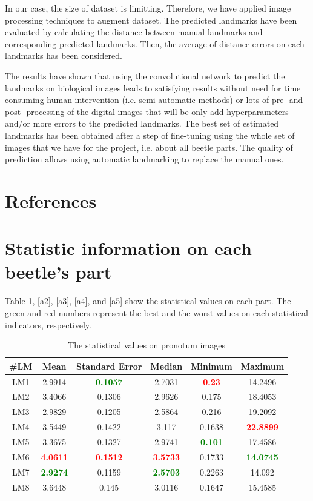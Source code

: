 \documentclass[review]{elsarticle}
\begin{document}
In our case, the size of dataset is limitting. Therefore, we have applied image processing techniques to augment dataset. The predicted landmarks have been evaluated by calculating the distance between manual landmarks and corresponding predicted landmarks. Then, the average of distance errors on each landmarks has been considered.

The results have shown that using the convolutional network to predict the landmarks on biological images leads to satisfying results without need for time consuming human intervention (i.e. semi-automatic methods) or lots of pre- and post- processing of the digital images that will be only add hyperparameters and/or more errors to the predicted landmarks. The
best set of estimated landmarks has been obtained after a step
of fine-tuning using the whole set of images that we have for the
project, i.e. about all beetle parts. The quality of prediction allows using automatic landmarking to replace the manual ones.
\section*{References}



\pagebreak
\appendix
\section{Statistic information on each beetle's part}
\label{appdixA}
Table \ref{a1}, \ref{a2}, \ref{a3}, \ref{a4}, and \ref{a5} show the statistical values on each part. The green and red numbers represent the best and the worst values on each statistical indicators, respectively.  
\begin{table}[htbp]
\begin{tabular}{ | c | c | c | c | c | c | }
\hline
	\textbf{\#LM} & \textbf{Mean} & \textbf{Standard Error} & \textbf{Median} & \textbf{Minimum} & \textbf{Maximum} \\ \hline
	LM1 & 2.9914 & \textcolor{green}{\textbf{0.1057}} & 2.7031 & \textcolor{red}{\textbf{0.23}} & 14.2496 \\ \hline
	LM2 & 3.4066 & 0.1306 & 2.9626 & 0.175 & 18.4053 \\ \hline
	LM3 & 2.9829 & 0.1205 & 2.5864 & 0.216 & 19.2092 \\ \hline
	LM4 & 3.5449 & 0.1422 & 3.117 & 0.1638 & \textcolor{red}{\textbf{22.8899}} \\ \hline
	LM5 & 3.3675 & 0.1327 & 2.9741 & \textcolor{green}{\textbf{0.101}} & 17.4586 \\ \hline
	LM6 & \textcolor{red}{\textbf{4.0611}} & \textcolor{red}{\textbf{0.1512}} & \textcolor{red}{\textbf{3.5733}} & 0.1733 & \textcolor{green}{\textbf{14.0745}} \\ \hline
	LM7 & \textcolor{green}{\textbf{2.9274}} & 0.1159 & \textcolor{green}{\textbf{2.5703}} & 0.2263 & 14.092 \\ \hline
	LM8 & 3.6448 & 0.145 & 3.0116 & 0.1647 & 15.4585 \\ \hline
\end{tabular}
\caption{The statistical values on pronotum images}
\label{a1}
\end{table}
\end{document}
